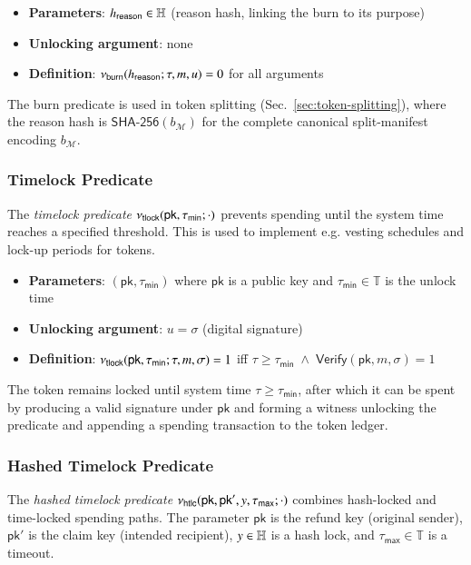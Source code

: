 \begin{itemize}
	\item \textbf{Parameters}: $h_\mathsf{reason} \in \mathbb{H}$ (reason hash, linking the burn to its purpose)
	\item \textbf{Unlocking argument}: none
	\item \textbf{Definition}: $\nu_\mathsf{burn}(h_\mathsf{reason}; \tau, m, u) = 0$ for all arguments
\end{itemize}

The burn predicate is used in token splitting (Sec.~\ref{sec:token-splitting}), where the reason hash is $\mathsf{SHA\text{-}256}(b_\mathcal{M})$ for the complete canonical split-manifest encoding $b_\mathcal{M}$.


\subsubsection{Timelock Predicate}

The \emph{timelock predicate} $\nu_\mathsf{tlock}(\mathsf{pk}, \tau_\mathsf{min};\cdot)$ prevents spending until the system time reaches a specified threshold. This is used to implement e.g. vesting schedules and lock-up periods for tokens.

\begin{itemize}
	\item \textbf{Parameters}: $(\mathsf{pk}, \tau_\mathsf{min})$ where $\mathsf{pk}$ is a public key and $\tau_\mathsf{min} \in \mathbb{T}$ is the unlock time
	\item \textbf{Unlocking argument}: $u = \sigma$ (digital signature)
	\item \textbf{Definition}: $\nu_\mathsf{tlock}(\mathsf{pk}, \tau_\mathsf{min}; \tau, m, \sigma) = 1$ iff $\tau \ge \tau_\mathsf{min} \;\land\; \mathsf{Verify}(\mathsf{pk}, m, \sigma) = 1$
\end{itemize}

The token remains locked until system time $\tau \ge \tau_\mathsf{min}$, after which it can be spent by producing a valid signature under $\mathsf{pk}$ and forming a witness unlocking the predicate and appending a spending transaction to the token ledger.


\subsubsection{Hashed Timelock Predicate}

The \emph{hashed timelock predicate} $\nu_\mathsf{htlc}(\mathsf{pk}, \mathsf{pk}', y, \tau_\mathsf{max};\cdot)$ combines hash-locked and time-locked spending paths. The parameter $\mathsf{pk}$ is the refund key (original sender), $\mathsf{pk}'$ is the claim key (intended recipient), $y \in \mathbb{H}$ is a hash lock, and $\tau_\mathsf{max} \in \mathbb{T}$ is a timeout.

